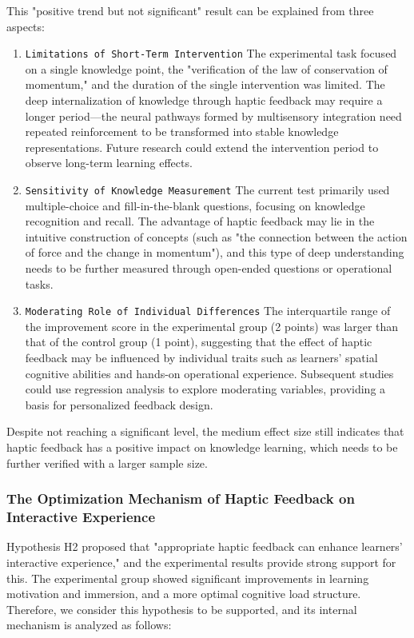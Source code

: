 \documentclass[runningheads]{llncs}
\begin{document}
This "positive trend but not significant" result can be explained from three aspects:

\begin{enumerate}[label={\arabic*)}]
 \item \texttt{Limitations of Short-Term Intervention} The experimental task focused on a single knowledge point, the "verification of the law of conservation of momentum," and the duration of the single intervention was limited. The deep internalization of knowledge through haptic feedback may require a longer period—the neural pathways formed by multisensory integration need repeated reinforcement to be transformed into stable knowledge representations. Future research could extend the intervention period to observe long-term learning effects.
 \item \texttt{Sensitivity of Knowledge Measurement} The current test primarily used multiple-choice and fill-in-the-blank questions, focusing on knowledge recognition and recall. The advantage of haptic feedback may lie in the intuitive construction of concepts (such as "the connection between the action of force and the change in momentum"), and this type of deep understanding needs to be further measured through open-ended questions or operational tasks.
 \item \texttt{Moderating Role of Individual Differences} The interquartile range of the improvement score in the experimental group (2 points) was larger than that of the control group (1 point), suggesting that the effect of haptic feedback may be influenced by individual traits such as learners' spatial cognitive abilities and hands-on operational experience. Subsequent studies could use regression analysis to explore moderating variables, providing a basis for personalized feedback design.
\end{enumerate}

Despite not reaching a significant level, the medium effect size still indicates that haptic feedback has a positive impact on knowledge learning, which needs to be further verified with a larger sample size.

\subsubsection{The Optimization Mechanism of Haptic Feedback on Interactive Experience}
Hypothesis H2 proposed that "appropriate haptic feedback can enhance learners' interactive experience," and the experimental results provide strong support for this. The experimental group showed significant improvements in learning motivation and immersion, and a more optimal cognitive load structure. Therefore, we consider this hypothesis to be supported, and its internal mechanism is analyzed as follows:
\end{document}
